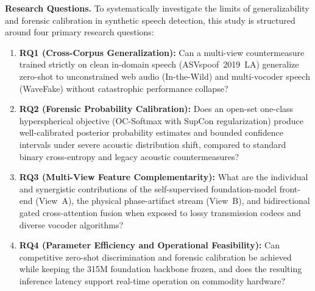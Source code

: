 \noindent\textbf{Research Questions.} To systematically investigate the limits of generalizability and forensic calibration in synthetic speech detection, this study is structured around four primary research questions:
\begin{enumerate}
    \item \textbf{RQ1 (Cross-Corpus Generalization):} Can a multi-view countermeasure trained strictly on clean in-domain speech (ASVspoof~2019~LA) generalize zero-shot to unconstrained web audio (In-the-Wild) and multi-vocoder speech (WaveFake) without catastrophic performance collapse?
    \item \textbf{RQ2 (Forensic Probability Calibration):} Does an open-set one-class hyperspherical objective (OC-Softmax with SupCon regularization) produce well-calibrated posterior probability estimates and bounded confidence intervals under severe acoustic distribution shift, compared to standard binary cross-entropy and legacy acoustic countermeasures?
    \item \textbf{RQ3 (Multi-View Feature Complementarity):} What are the individual and synergistic contributions of the self-supervised foundation-model front-end (View~A), the physical phase-artifact stream (View~B), and bidirectional gated cross-attention fusion when exposed to lossy transmission codecs and diverse vocoder algorithms?
    \item \textbf{RQ4 (Parameter Efficiency and Operational Feasibility):} Can competitive zero-shot discrimination and forensic calibration be achieved while keeping the 315M foundation backbone frozen, and does the resulting inference latency support real-time operation on commodity hardware?
\end{enumerate}

